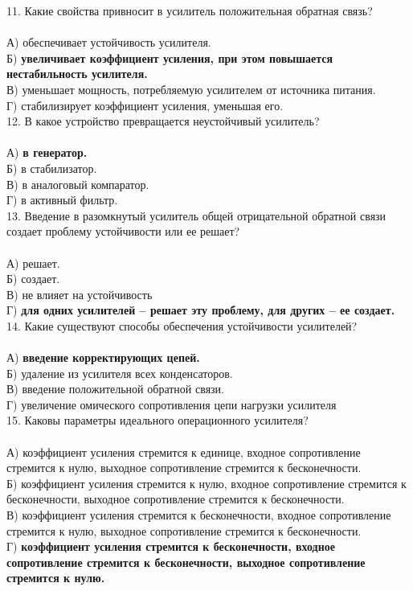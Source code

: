 11. Какие свойства привносит в усилитель положительная обратная связь?\\\\
А) обеспечивает устойчивость усилителя.\\
Б) \textbf{увеличивает коэффициент усиления, при этом повышается нестабильность усилителя.}\\
В) уменьшает мощность, потребляемую усилителем от источника питания.\\
Г) стабилизирует коэффициент усиления, уменьшая его.\\

12. В какое устройство превращается неустойчивый усилитель?\\\\
А) \textbf{в генератор.} \\
Б) в стабилизатор.\\
В) в аналоговый компаратор.\\
Г) в активный фильтр.\\

13. Введение в разомкнутый усилитель общей отрицательной обратной связи создает проблему устойчивости или ее решает?\\\\
А) решает.\\
Б) создает.\\
В) не влияет на устойчивость\\
Г) \textbf{для одних усилителей – решает эту проблему, для других – ее создает.}\\

14. Какие существуют способы обеспечения устойчивости усилителей?\\\\
А) \textbf{введение корректирующих цепей.}\\
Б) удаление из усилителя всех конденсаторов.\\
В) введение положительной обратной связи.\\
Г) увеличение омического сопротивления цепи нагрузки усилителя\\

15. Каковы параметры идеального операционного усилителя?\\\\
А) коэффициент усиления стремится к единице, входное сопротивление стремится к нулю, выходное сопротивление стремится к бесконечности.\\
Б) коэффициент усиления стремится к нулю, входное сопротивление стремится к бесконечности, выходное сопротивление стремится к бесконечности.\\
В) коэффициент усиления стремится к бесконечности, входное сопротивление стремится к нулю, выходное сопротивление стремится к бесконечности.\\
Г) \textbf{коэффициент усиления стремится к бесконечности, входное сопротивление стремится к бесконечности, выходное сопротивление стремится к нулю.}\\

